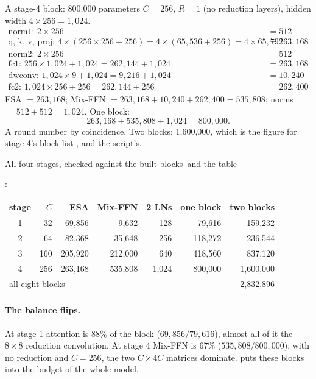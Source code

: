 \begin{worked}[label={we:block:stage4}]{A stage-4 block: 800{,}000 parameters}
$C = 256$, $R = 1$ (no reduction layers), hidden width $4\times256 = 1{,}024$.
\begin{align*}
  \text{norm1: } 2\times256 &= 512\\
  \text{q, k, v, proj: } 4\times(256\times256 + 256) = 4\times(65{,}536 + 256) = 4\times65{,}792 &= 263{,}168\\
  \text{norm2: } 2\times256 &= 512\\
  \text{fc1: } 256\times1{,}024 + 1{,}024 = 262{,}144 + 1{,}024 &= 263{,}168\\
  \text{dwconv: } 1{,}024\times9 + 1{,}024 = 9{,}216 + 1{,}024 &= 10{,}240\\
  \text{fc2: } 1{,}024\times256 + 256 = 262{,}144 + 256 &= 262{,}400
\end{align*}
ESA $= 263{,}168$; Mix-FFN $= 263{,}168 + 10{,}240 + 262{,}400 = 535{,}808$; norms $= 512 + 512 =
1{,}024$. One block:
\[
  263{,}168 + 535{,}808 + 1{,}024 = 800{,}000 .
\]
A round number by coincidence. Two blocks: 1{,}600{,}000, which is the  figure for
stage 4's block list , and the
script's\tagC.
\end{worked}

All four stages, checked against the built blocks\tagC\ and the  table
\par\noindent{}:
\begin{center}
\begin{tabular}{crrrrrr}
\toprule
stage & $C$ & ESA & Mix-FFN & 2 LNs & one block & two blocks\\
\midrule
1 & 32 & 69{,}856 & 9{,}632 & 128 & 79{,}616 & 159{,}232\\
2 & 64 & 82{,}368 & 35{,}648 & 256 & 118{,}272 & 236{,}544\\
3 & 160 & 205{,}920 & 212{,}000 & 640 & 418{,}560 & 837{,}120\\
4 & 256 & 263{,}168 & 535{,}808 & 1{,}024 & 800{,}000 & 1{,}600{,}000\\
\midrule
\multicolumn{6}{l}{all eight blocks} & 2{,}832{,}896\\
\bottomrule
\end{tabular}
\end{center}

\paragraph{The balance flips.} At stage 1 attention is 88\% of the block ($69{,}856/79{,}616$),
almost all of it the $8\times8$ reduction convolution. At stage 4 Mix-FFN is 67\%
($535{,}808/800{,}000$): with no reduction and $C = 256$, the two $C\times4C$ matrices dominate.
 puts these blocks into the budget of the whole model.

